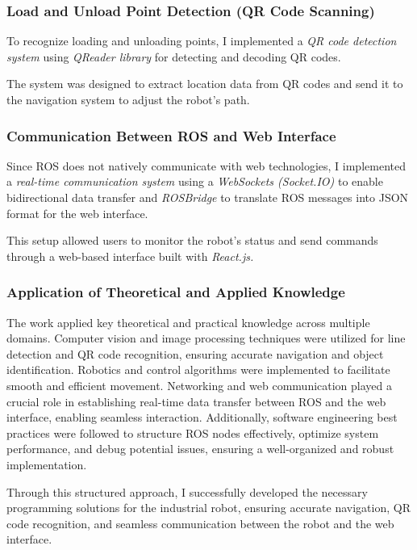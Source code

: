 \documentclass[../../main]{subfiles}
\begin{document}
\subsubsection{Load and Unload Point Detection (QR Code Scanning)}

To recognize loading and unloading points, I implemented a \emph{QR code
detection system} using \emph{QReader library} for detecting and
decoding QR codes.

The system was designed to extract location data from QR codes and send
it to the navigation system to adjust the robot's path.

\subsubsection{Communication Between ROS and Web Interface}

Since ROS does not natively communicate with web technologies, I
implemented a \emph{real-time communication system} using a
\emph{WebSockets (Socket.IO)} to enable bidirectional data transfer and
\emph{ROSBridge} to translate ROS messages into JSON format for the web
interface.

This setup allowed users to monitor the robot's status and send commands
through a web-based interface built with \emph{React.js.}

\subsubsection{Application of Theoretical and Applied Knowledge}
The work applied key theoretical and practical knowledge across multiple
domains. Computer vision and image processing techniques were utilized
for line detection and QR code recognition, ensuring accurate navigation
and object identification. Robotics and control algorithms were
implemented to facilitate smooth and efficient movement. Networking and
web communication played a crucial role in establishing real-time data
transfer between ROS and the web interface, enabling seamless
interaction. Additionally, software engineering best practices were
followed to structure ROS nodes effectively, optimize system
performance, and debug potential issues, ensuring a well-organized and
robust implementation.

Through this structured approach, I successfully developed the necessary
programming solutions for the industrial robot, ensuring accurate
navigation, QR code recognition, and seamless communication between the
robot and the web interface.
\end{document}
